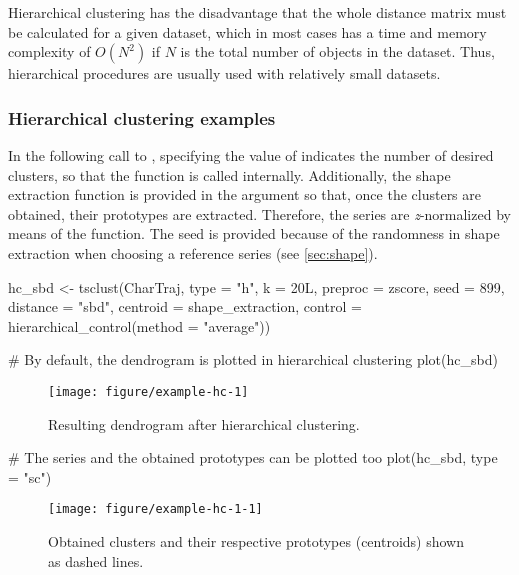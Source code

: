 Hierarchical clustering has the disadvantage that the whole distance matrix must be calculated for a given dataset,
which in most cases has a time and memory complexity of $O(N^2)$ if $N$ is the total number of objects in the dataset.
Thus, hierarchical procedures are usually used with relatively small datasets.

\subsubsection{Hierarchical clustering examples}

In the following call to ,
specifying the value of  indicates the number of desired clusters,
so that the  function is called internally.
Additionally, the shape extraction function is provided in the  argument so that,
once the  clusters are obtained,
their prototypes are extracted.
Therefore, the series are \textit{z}-normalized by means of the  function.
The seed is provided because of the randomness in shape extraction when choosing a reference series (see \cref{sec:shape}).

\begin{example}
hc_sbd <- tsclust(CharTraj, type = "h", k = 20L,
                  preproc = zscore, seed = 899,
                  distance = "sbd", centroid = shape_extraction,
                  control = hierarchical_control(method = "average"))

# By default, the dendrogram is plotted in hierarchical clustering
plot(hc_sbd)
\end{example}

\begin{figure}[htbp]
	
	{\centering \texttt{[image: figure/example-hc-1]}
		
	}
	
	\caption{Resulting dendrogram after hierarchical clustering.}\label{fig:example-hc}
\end{figure}

\begin{example}
# The series and the obtained prototypes can be plotted too
plot(hc_sbd, type = "sc")
\end{example}

\begin{figure}[htbp]
	
	{\centering \texttt{[image: figure/example-hc-1-1]}
		
	}
	
	\caption{Obtained clusters and their respective prototypes (centroids) shown as dashed lines.}\label{fig:example-hc-1}
\end{figure}

